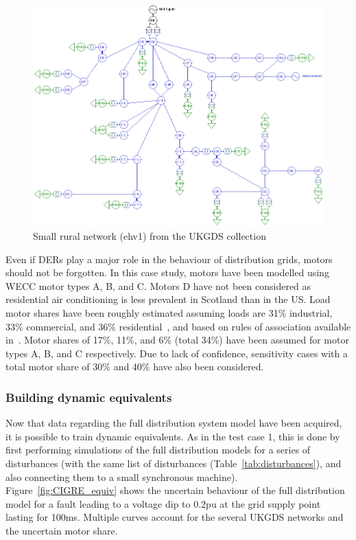 \begin{figure}
    \centering
    \includegraphics[width=0.8\linewidth]{Figs/ehv1.png}
    \caption{Small rural network (ehv1) from the UKGDS collection~\cite{UKGDS}}
    \label{fig:ehv1}
\end{figure}

Even if DERs play a major role in the behaviour of distribution grids, motors should not be forgotten. In this case study, motors have been modelled using WECC motor types A, B, and C. Motors D have not been considered as residential air conditioning is less prevalent in Scotland than in the US. Load motor shares have been roughly estimated assuming loads are 31\% industrial, 33\% commercial, and 36\% residential~\cite{UK_motor_share}, and based on rules of association available in~\cite{WECC_CLM_association}. Motor shares of 17\%, 11\%, and 6\% (total 34\%) have been assumed for motor types A, B, and C respectively. Due to lack of confidence, sensitivity cases with a total motor share of 30\% and 40\% have also been considered.

\subsubsection{Building dynamic equivalents}
\label{sec:CIGRE_distrib_equiv}

Now that data regarding the full distribution system model have been acquired, it is possible to train dynamic equivalents. As in the test case 1, this is done by first performing simulations of the full distribution models for a series of disturbances (with the same list of disturbances (Table~\ref{tab:disturbances}), and also connecting them to a small synchronous machine). Figure~\ref{fig:CIGRE_equiv} shows the uncertain behaviour of the full distribution model for a fault leading to a voltage dip to 0.2pu at the grid supply point lasting for 100ms. Multiple curves account for the  several UKGDS networks and the uncertain motor share.

